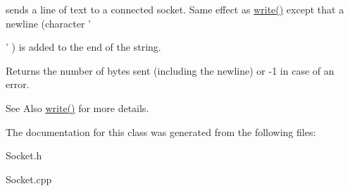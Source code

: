 sends a line of text to a connected socket. Same effect as \hyperlink{classSocketBuffer_a26cf495283bfd370bd0c1f1503aa3a23}{write()} except that a newline (character '\par
' ) is added to the end of the string. \begin{DoxyReturn}{Returns}
the number of bytes sent (including the newline) or -\/1 in case of an error. 
\end{DoxyReturn}
\begin{DoxySeeAlso}{See Also}
\hyperlink{classSocketBuffer_a26cf495283bfd370bd0c1f1503aa3a23}{write()} for more details. 
\end{DoxySeeAlso}


The documentation for this class was generated from the following files\-:\begin{DoxyCompactItemize}
\item 
Socket.\-h\item 
Socket.\-cpp\end{DoxyCompactItemize}
